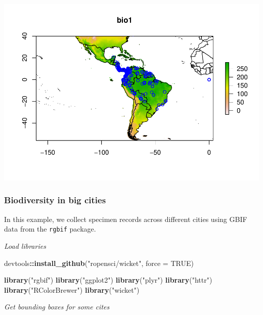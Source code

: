 \documentclass[author-year, review, 11pt]{components/elsarticle} %
\makeatletter
\newenvironment{Shaded}{\begin{snugshade}}{\end{snugshade}}
\newcommand{\KeywordTok}[1]{\textcolor[rgb]{0.13,0.29,0.53}{\textbf{#1}}}
\newcommand{\DataTypeTok}[1]{\textcolor[rgb]{0.13,0.29,0.53}{#1}}
\newcommand{\StringTok}[1]{\textcolor[rgb]{0.31,0.60,0.02}{#1}}
\newcommand{\OtherTok}[1]{\textcolor[rgb]{0.56,0.35,0.01}{#1}}
\newcommand{\OperatorTok}[1]{\textcolor[rgb]{0.81,0.36,0.00}{\textbf{#1}}}
\newcommand{\NormalTok}[1]{#1}
\def\maxwidth{\ifdim\Gin@nat@width>\linewidth\linewidth
\else\Gin@nat@width\fi}
\let\Oldincludegraphics\includegraphics
\renewcommand{\includegraphics}[1]{\Oldincludegraphics[width=\maxwidth]{#1}}
\makeatother
\begin{document}
\includegraphics{components/figure/manuscript-unnamed-chunk-53-1.pdf}

\subsubsection{Biodiversity in big
cities}\label{biodiversity-in-big-cities}

In this example, we collect specimen records across different cities
using GBIF data from the \texttt{rgbif} package.

\emph{Load libraries}

\begin{Shaded}
\begin{Highlighting}[]
\NormalTok{devtools}\OperatorTok{::}\KeywordTok{install_github}\NormalTok{(}\StringTok{"ropensci/wicket"}\NormalTok{, }\DataTypeTok{force =} \OtherTok{TRUE}\NormalTok{)}
\end{Highlighting}
\end{Shaded}

\begin{Shaded}
\begin{Highlighting}[]
\KeywordTok{library}\NormalTok{(}\StringTok{"rgbif"}\NormalTok{)}
\KeywordTok{library}\NormalTok{(}\StringTok{"ggplot2"}\NormalTok{)}
\KeywordTok{library}\NormalTok{(}\StringTok{"plyr"}\NormalTok{)}
\KeywordTok{library}\NormalTok{(}\StringTok{"httr"}\NormalTok{)}
\KeywordTok{library}\NormalTok{(}\StringTok{"RColorBrewer"}\NormalTok{)}
\KeywordTok{library}\NormalTok{(}\StringTok{"wicket"}\NormalTok{)}
\end{Highlighting}
\end{Shaded}

\emph{Get bounding boxes for some cites}
\end{document}
